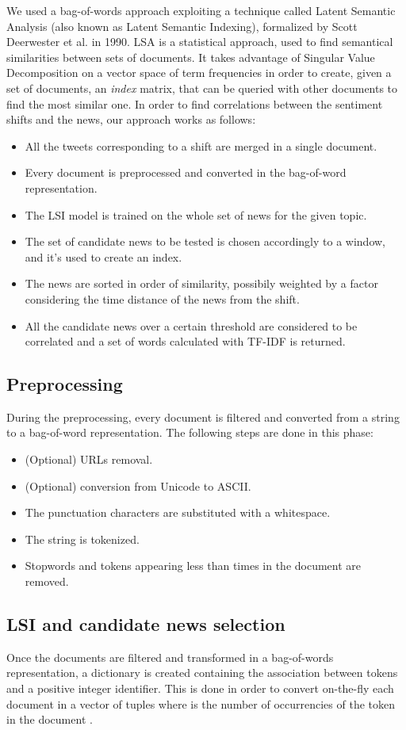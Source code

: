 We used a bag-of-words approach exploiting a technique called Latent Semantic Analysis (also known as Latent Semantic Indexing), formalized by Scott Deerwester et al. in 1990\cite{Deerwester}. LSA is a statistical approach, used to find semantical similarities between sets of documents. It takes advantage of Singular Value Decomposition on a vector space of term frequencies in order to create, given a set of documents, an \emph{index} matrix, that can be queried with other documents to find the most similar one. In order to find correlations between the sentiment shifts and the news, our approach works as follows:
\begin{itemize}
\item All the tweets corresponding to a shift are merged in a single document.
\item Every document is preprocessed and converted in the bag-of-word representation.
\item The LSI model is trained on the whole set of news for the given topic.
\item The set of candidate news to be tested is chosen accordingly to a window, and it's used to create an index.
\item The news are sorted in order of similarity, possibily weighted by a factor considering the time distance of the news from the shift.
\item All the candidate news over a certain threshold are considered to be correlated and a set of words calculated with TF-IDF is returned.
\end{itemize}

\subsection{Preprocessing}
During the preprocessing, every document is filtered and converted from a string to a bag-of-word representation. The following steps are done in this phase:
\begin{itemize}
\item (Optional) URLs removal.
\item (Optional) conversion from Unicode to ASCII.
\item The punctuation characters are substituted with a whitespace.
\item The string is tokenized.
\item Stopwords and tokens appearing less than  times in the document are removed.
\end{itemize}

\subsection{LSI and candidate news selection}
Once the documents are filtered and transformed in a bag-of-words representation, a dictionary is created containing the association between tokens and a positive integer identifier. This is done in order to convert on-the-fly each document  in a vector of tuples  where  is the number of occurrencies of the token  in the document .